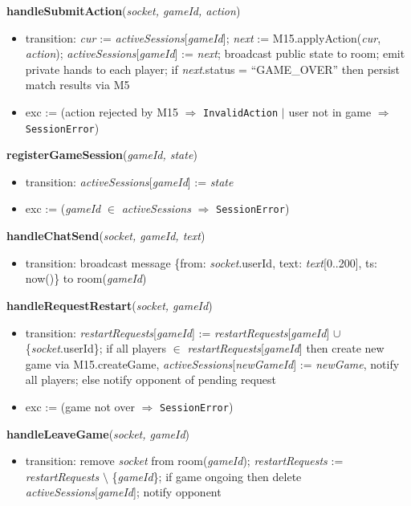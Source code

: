 \documentclass[12pt, titlepage]{article}
\begin{document}
\noindent\textbf{handleSubmitAction}(\textit{socket, gameId, action})
\begin{itemize}
    \item transition: \textit{cur} := \textit{activeSessions}[\textit{gameId}]; \textit{next} := M15.applyAction(\textit{cur}, \textit{action}); \textit{activeSessions}[\textit{gameId}] := \textit{next}; broadcast public state to room; emit private hands to each player; if \textit{next}.status = ``GAME\_OVER'' then persist match results via M5
    \item exc := (action rejected by M15 $\Rightarrow$ \texttt{InvalidAction} $|$ user not in game $\Rightarrow$ \texttt{SessionError})
\end{itemize}

\noindent\textbf{registerGameSession}(\textit{gameId, state})
\begin{itemize}
    \item transition: \textit{activeSessions}[\textit{gameId}] := \textit{state}
    \item exc := (\textit{gameId} $\in$ \textit{activeSessions} $\Rightarrow$ \texttt{SessionError})
\end{itemize}

\noindent\textbf{handleChatSend}(\textit{socket, gameId, text})
\begin{itemize}
    \item transition: broadcast message \{from: \textit{socket}.userId, text: \textit{text}[0..200], ts: now()\} to room(\textit{gameId})
\end{itemize}

\noindent\textbf{handleRequestRestart}(\textit{socket, gameId})
\begin{itemize}
    \item transition: \textit{restartRequests}[\textit{gameId}] := \textit{restartRequests}[\textit{gameId}] $\cup$ \{\textit{socket}.userId\}; if all players $\in$ \textit{restartRequests}[\textit{gameId}] then create new game via M15.createGame, \textit{activeSessions}[\textit{newGameId}] := \textit{newGame}, notify all players; else notify opponent of pending request
    \item exc := (game not over $\Rightarrow$ \texttt{SessionError})
\end{itemize}

\noindent\textbf{handleLeaveGame}(\textit{socket, gameId})
\begin{itemize}
    \item transition: remove \textit{socket} from room(\textit{gameId}); \textit{restartRequests} := \textit{restartRequests} $\setminus$ \{\textit{gameId}\}; if game ongoing then delete \textit{activeSessions}[\textit{gameId}]; notify opponent
\end{itemize}
\end{document}
